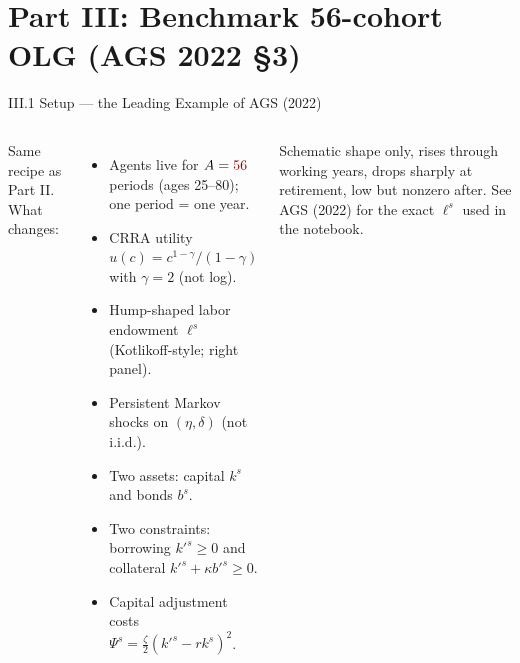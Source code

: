 \documentclass[aspectratio=169,11pt]{beamer}
\newcommand{\emphc}[1]{\textcolor{harvardcrimson}{#1}}
\begin{document}

\section{Part III: Benchmark 56-cohort OLG (AGS 2022 \S 3)}

\begin{frame}{III.1 Setup --- the Leading Example of AGS (2022)}
\small
\begin{columns}[T]
\emphc{Same recipe as Part II.  What changes:}
\begin{itemize}\itemsep1pt
    \item Agents live for $A = \emphc{56}$ periods (ages 25--80); one period = one year.
    \item CRRA utility $u(c) = c^{1-\gamma}/(1-\gamma)$ with $\gamma = 2$ (\emphc{not} log).
    \item \emphc{Hump-shaped labor endowment} $\ell^s$ (Kotlikoff-style; right panel).
    \item \emphc{Persistent} Markov shocks on $(\eta,\delta)$ (not i.i.d.).
    \item \emphc{Two assets}: capital $k^s$ and bonds $b^s$.
    \item \emphc{Two constraints}: borrowing $k'^s \ge 0$ and collateral $k'^s + \kappa b'^s \ge 0$.
    \item Capital adjustment costs $\Psi^s = \tfrac{\zeta}{2}(k'^s - r k^s)^2$.
\end{itemize}

\centering
{}

{\scriptsize \emphc{Schematic shape only}, rises through working years, drops sharply at retirement, low but nonzero after.  See AGS (2022) for the exact $\ell^s$ used in the notebook.}
\end{columns}
\end{frame}
\end{document}
